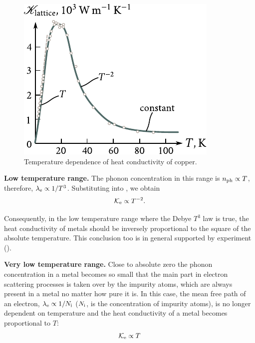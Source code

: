 \begin{figure}[t]
	\begin{center}
		\includegraphics[scale=1]{figures/ch_04/fig_4_10.pdf}
		\caption[]{Temperature dependence of heat conductivity of copper.}
		\label{fig:4_10}
	\end{center}
	\vspace{-0.7cm}
\end{figure}

\textbf{Low temperature range.} The phonon concentration in this range is $n_{\text{ph}}\propto T$, therefore, $\lambda_{\text{e}}\propto 1/T^3$. Substituting into , we obtain
\begin{equation}\label{eq:4_60}
    \mathcal{K}_{\text{e}} \propto T^{-2}.
\end{equation}

Consequently, in the low temperature range where the Debye $T^3$ law is true, the heat conductivity of metals should be inversely proportional to the square of the absolute temperature. This conclusion too is in general supported by experiment ().

\textbf{Very low temperature range.} Close to absolute zero the phonon concentration in a metal becomes so small that the main part in electron scattering processes is taken over by the impurity atoms, which are always present in a metal no matter how pure it is. In this case, the mean free path of an electron, $\lambda_{\text{e}}\propto 1/N_{\text{i}}$ ($N_{\text{i}}$, is the concentration of impurity atoms), is no longer dependent on temperature and the heat conductivity of a metal becomes proportional to $T$:
\begin{equation}\label{eq:4_61}
    \mathcal{K}_{\text{e}} \propto T
\end{equation}

